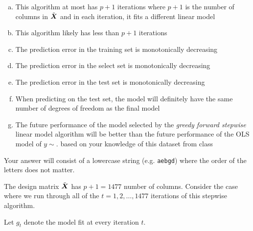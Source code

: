 \documentclass[12pt,landscape]{article}
\newcommand{\instr}{\small Your answer will consist of a lowercase string (e.g. \texttt{aebgd}) where the order of the letters does not matter. \normalsize}
\begin{document}
\vspace{-0.2cm}\benum{}

\begin{enumerate}[(a)]
\item This algorithm at most has $p+1$ iterations where $p+1$ is the number of columns in $\tilde{\boldsymbol{X}}$ and in each iteration, it fits a different linear model
\item This algorithm likely has less than $p+1$ iterations
\item The prediction error in the training set is monotonically decreasing
\item The prediction error in the select set is monotonically decreasing
\item The prediction error in the test set is monotonically decreasing
\item When predicting on the test set, the model will definitely have the same number of degrees of freedom as the final model
\item The future performance of the model selected by the \emph{greedy forward stepwise} linear model algorithm will be better than the future performance of the OLS model of  $y \sim .$ based on your knowledge of this dataset from class
\end{enumerate}
\eenum\instr\pagebreak


\problem{}  The design matrix $\tilde{\boldsymbol{X}}$ has $p+1 = 1477$ number of columns. Consider the case where we run through all of the $t = 1, 2, \ldots, 1477$ iterations of this stepwise algorithm.

\vspace{-0.2cm}\benum{}

Let $g_t$ denote the model fit at every iteration $t$.
\end{document}
